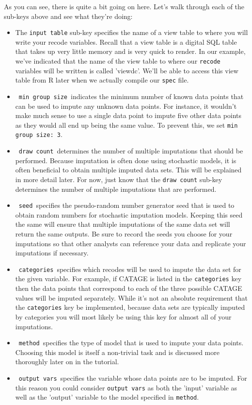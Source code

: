 \documentclass{article}
\begin{document}
As you can see, there is quite a bit going on here. Let's walk through each of the sub-keys 
above and see what they're doing:
\begin{itemize}
\item The {\tt input table} sub-key specifies the name of a view table to 
where you will write your recode variables. Recall that a view table is a digital SQL table 
that takes up very little memory and is very quick to render. In our example, we've indicated 
that the name of the view table to where our {\tt recode} variables will be written is 
called 'viewdc'. We'll be able to access this view table from R later when we actually 
compile our {\tt spec} file.\\
\item \ {\tt min group size}\ indicates the minimum number of known data points that can be 
used to impute any unknown data points. For instance, it wouldn't make much sense to use a single 
data point to impute five other data points as they would all end up being the same value. To 
prevent this, we set {\tt min group size: 3}.\\
\item \ {\tt draw count}\ determines the number of multiple imputations that should be performed. 
Because imputation is often done using stochastic models, it is often beneficial to obtain multiple 
imputed data sets. This will be explained in more detail later. For now, just know that the {\tt draw count} 
sub-key determines the number of multiple imputations that are performed.\\
\item \ {\tt seed}\ specifies the pseudo-random number generator seed that is used to obtain 
random numbers for stochastic imputation models. Keeping this seed the same will ensure that multiple imputations of the same data set will return the same outputs. Be sure to record the seeds you choose for your 
imputations so that other analysts can reference your data and replicate your imputations if necessary.\\
\item \ {\tt categories}\  specifies which recodes will be used to impute the data set for 
the given variable. For example, if CATAGE is listed in the {\tt categories} key then the 
data points that correspond to each of the three possible CATAGE values will be imputed 
separately. While it's not an absolute requirement that the {\tt categories} key be implemented, because data 
sets are typically imputed by categories you will most likely be using this key for almost all 
of your imputations.\\
\item \ {\tt method}\ specifies the type of model that is used to impute your data points. 
Choosing this model is itself a non-trivial task and is discussed more thoroughly later on 
in the tutorial.\\
\item \ {\tt output vars}\ specifies the variable whose data points are to be imputed. For this reason 
you could consider {\tt output vars} as both the 'input' variable as well as the 'output' variable 
to the model specified in {\tt method}.\\
\end{itemize}
\end{document}
